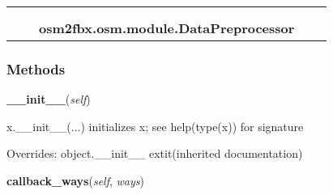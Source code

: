    \label{osm2fbx:osm:module:DataPreprocessor}
\begin{tabular}{cccccc}
\multicolumn{2}{r}{\settowidth{\BCL}{object}\multirow{2}{\BCL}{object}}
&&
  \\\cline{3-3}
  &&\multicolumn{1}{c|}{}
&&
  \\
&&\multicolumn{2}{l}{\textbf{osm2fbx.osm.module.DataPreprocessor}}
\end{tabular}



  \subsubsection{Methods}

    \vspace{0.5ex}

\hspace{.8\funcindent}\begin{boxedminipage}{\funcwidth}

    \raggedright \textbf{\_\_init\_\_}(\textit{self})

\setlength{\parskip}{2ex}
    x.\_\_init\_\_(...) initializes x; see help(type(x)) for signature

\setlength{\parskip}{1ex}
      Overrides: object.\_\_init\_\_ 	extit{(inherited documentation)}

    \end{boxedminipage}

    \label{osm2fbx:osm:module:DataPreprocessor:callback_ways}

    \vspace{0.5ex}

\hspace{.8\funcindent}\begin{boxedminipage}{\funcwidth}

    \raggedright \textbf{callback\_ways}(\textit{self}, \textit{ways})

\setlength{\parskip}{2ex}
\setlength{\parskip}{1ex}
    \end{boxedminipage}

